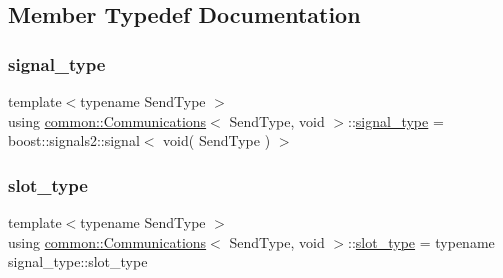 \subsection{Member Typedef Documentation}
\mbox{\label{classcommon_1_1Communications_3_01SendType_00_01void_01_4_a9bae0c78acbf37200d02670f0b978120}} 
\subsubsection{\texorpdfstring{signal\+\_\+type}{signal\_type}}
{\footnotesize\ttfamily template$<$typename Send\+Type $>$ \\
using \mbox{\hyperlink{classcommon_1_1Communications}{common\+::\+Communications}}$<$ Send\+Type, void $>$\+::\mbox{\hyperlink{classcommon_1_1Communications_3_01SendType_00_01void_01_4_a9bae0c78acbf37200d02670f0b978120}{signal\+\_\+type}} =  boost\+::signals2\+::signal$<$ void( Send\+Type ) $>$\hspace{0.3cm}{\ttfamily [private]}}

\mbox{\label{classcommon_1_1Communications_3_01SendType_00_01void_01_4_afd0ffbe5cd762b7a03402664b19a69aa}} 
\subsubsection{\texorpdfstring{slot\+\_\+type}{slot\_type}}
{\footnotesize\ttfamily template$<$typename Send\+Type $>$ \\
using \mbox{\hyperlink{classcommon_1_1Communications}{common\+::\+Communications}}$<$ Send\+Type, void $>$\+::\mbox{\hyperlink{classcommon_1_1Communications_3_01SendType_00_01void_01_4_afd0ffbe5cd762b7a03402664b19a69aa}{slot\+\_\+type}} =  typename signal\+\_\+type\+::slot\+\_\+type\hspace{0.3cm}{\ttfamily [private]}}



